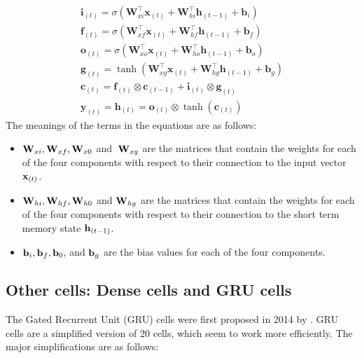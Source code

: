 \begin{equation} 
    \begin{array}{l}
    \mathbf{i}_{(t)}=\sigma\left(\mathbf{W}_{x i}^{\top} \mathbf{x}_{(t)}+\mathbf{W}_{h i}^{\top} \mathbf{h}_{(t-1)}+\mathbf{b}_{i}\right) \\
    \mathbf{f}_{(t)}=\sigma\left(\mathbf{W}_{x f}^{\top} \mathbf{x}_{(t)}+\mathbf{W}_{h f}^{\top} \mathbf{h}_{(t-1)}+\mathbf{b}_{f}\right) \\
    \mathbf{o}_{(t)}=\sigma\left(\mathbf{W}_{x o}^{\top} \mathbf{x}_{(t)}+\mathbf{W}_{h o}^{\top} \mathbf{h}_{(t-1)}+\mathbf{b}_{o}\right) \\
    \mathbf{g}_{(t)}=\tanh \left(\mathbf{W}_{x g}^{\top} \mathbf{x}_{(t)}+\mathbf{W}_{h g}^{\top} \mathbf{h}_{(t-1)}+\mathbf{b}_{g}\right) \\
    \mathbf{c}_{(t)}=\mathbf{f}_{(t)} \otimes \mathbf{c}_{(t-1)}+\mathbf{i}_{(t)} \otimes \mathbf{g}_{(t)} \\
    \mathbf{y}_{(t)}=\mathbf{h}_{(t)}=\mathbf{o}_{(t)} \otimes \tanh \left(\mathbf{c}_{(t)}\right)
    \end{array}
    \label{systemformula}
\end{equation}
The meanings of the terms in the equations are as follows:

\begin{itemize}
    \item  ${\bf W}_{xi} , {\bf W}_{xf} , {\bf W}_{x0}$ and $\: {\bf W}_{xg}$ are the matrices that contain the weights for each of the four components with respect to their connection to the input vector ${\bf x}_{(t)}$.
   
    \item ${\bf W}_{hi} , {\bf W}_{hf} , {\bf W}_{h0}$ and ${\bf W}_{hg}$ are the matrices that contain the weights for each of the four components with respect to their connection to the short term memory state ${\bf h}_{(t-1)}$.
    
    \item ${\bf b}_{i} , {\bf b}_{f}, {\bf b}_{0},$  and ${\bf b}_{g}$ are the bias values for each of the four components. 

\end{itemize}

\clearpage

\subsection{Other cells: Dense cells and GRU cells}
The Gated Recurrent Unit (GRU) cells were first proposed in 2014 by \autocite{22}. GRU cells are a simplified version of 20 cells, which seem to work more efficiently. The major simplifications are as follows:

